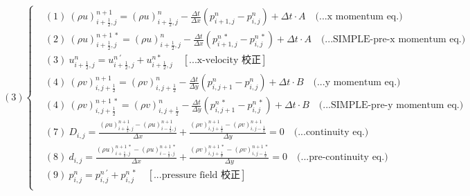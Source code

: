 \documentclass[12pt]{article}
\begin{document}
\begin{equation}
(3)
\left\{
\begin{aligned}
    &(1)\ (\rho u)_{i+\frac{1}{2},j}^{n+1} = (\rho u)_{i+\frac{1}{2},j}^{n} - \frac{\Delta t}{\Delta x}(p_{i+1,j}^{n} - p_{i,j}^{n}) + \Delta t \cdot A  \quad \text{(...x momentum eq.)}\\[1.5ex]
    &(2)\ (\rho u)_{i+\frac{1}{2},j}^{n+1\ *} = (\rho u)_{i+\frac{1}{2},j}^{n} - \frac{\Delta t}{\Delta x}(p_{i+1,j}^{n\ *} - p_{i,j}^{n\ *}) + \Delta t \cdot A \quad \text{(...SIMPLE-pre-x momentum eq.)}\\[1.5ex]
    &(3)\ u_{i+\frac{1}{2},j}^{n} = u_{i+\frac{1}{2},j}^{n\ '} + u_{i+\frac{1}{2},j}^{n *}  \quad \left[\text{...x-velocity 校正}\right]\\[1.5ex]
    &(4)\ (\rho v)_{i,j+\frac{1}{2}}^{n+1} = (\rho v)_{i,j+\frac{1}{2}}^{n} - \frac{\Delta t}{\Delta y}(p_{i,j+1}^{n} - p_{i,j}^{n}) + \Delta t \cdot B  \quad \text{(...y momentum eq.)}\\[1.5ex]
    &(4)\ (\rho v)_{i,j+\frac{1}{2}}^{n+1\ *} = (\rho v)_{i,j+\frac{1}{2}}^{n} - \frac{\Delta t}{\Delta y}(p_{i,j+1}^{n\ *} - p_{i,j}^{n\ *}) + \Delta t \cdot B  \quad \text{(...SIMPLE-pre-y momentum eq.)}\\[1.5ex]
    &(7)\ D_{i,j} = \frac{(\rho u)_{i+\frac{1}{2},j}^{n+1} - (\rho u)_{i-\frac{1}{2},j}^{n+1}}{\Delta x} + \frac{(\rho v)_{i,j+\frac{1}{2}}^{n+1} - (\rho v)_{i,j-\frac{1}{2}}^{n+1}}{\Delta y} = 0 \quad \text{(...continuity eq.)}\\[1.5ex]
    &(8)\ d_{i,j} = \frac{(\rho u)_{i+\frac{1}{2},j}^{n+1\ *} - (\rho u)_{i-\frac{1}{2},j}^{n+1\ *}}{\Delta x} + \frac{(\rho v)_{i,j+\frac{1}{2}}^{n+1\ *} - (\rho v)_{i,j-\frac{1}{2}}^{n+1\ *}}{\Delta y} = 0 \quad \text{(...pre-continuity eq.)}\\[1.5ex]
    &(9)\ p_{i,j}^{n} = p_{i,j}^{n\ \prime} + p_{i,j}^{n\ *} \quad\left[\text{...pressure field 校正}\right]\\[1.5ex]
\end{aligned}
\right.
\end{equation}
\newpage
\end{document}
